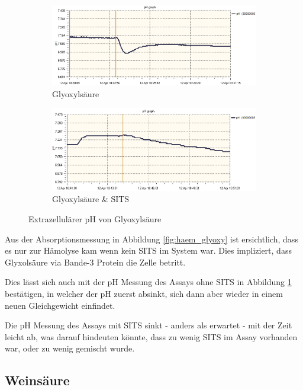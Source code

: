 \documentclass[a4paper,german]{scrreprt}
\begin{document}
\begin{figure}
	\centering
	\begin{subfigure}{.5\textwidth}
		\centering
		\includegraphics[width=\linewidth]{img/ph_glyoxy.png}
		\caption{Glyoxylsäure}
	\end{subfigure}%
	\begin{subfigure}{.5\textwidth}
		\centering
		\includegraphics[width=\linewidth]{img/ph_glyoxy_sits.png}
		\caption{Glyoxylsäure \& SITS}
	\end{subfigure}
	\caption{Extrazellulärer pH von Glyoxylsäure}
	\label{fig:ph_glyoxy}
\end{figure}

Aus der Absorptionsmessung in Abbildung \ref{fig:haem_glyoxy} ist ersichtlich,
dass es nur zur Hämolyse kam wenn kein SITS im System war. Dies impliziert,
dass Glyxolsäure via Bande-3 Protein die Zelle betritt.

Dies lässt sich auch mit der pH Messung des Assays ohne SITS in Abbildung
\ref{fig:ph_glyoxy} bestätigen, in welcher der pH zuerst absinkt, sich dann
aber wieder in einem neuen Gleichgewicht einfindet.

Die pH Messung des Assays mit SITS sinkt - anders als erwartet - mit der Zeit
leicht ab, was darauf hindeuten könnte, dass zu wenig SITS im Assay vorhanden
war, oder zu wenig gemischt wurde.

\subsection{Weinsäure}
\end{document}
